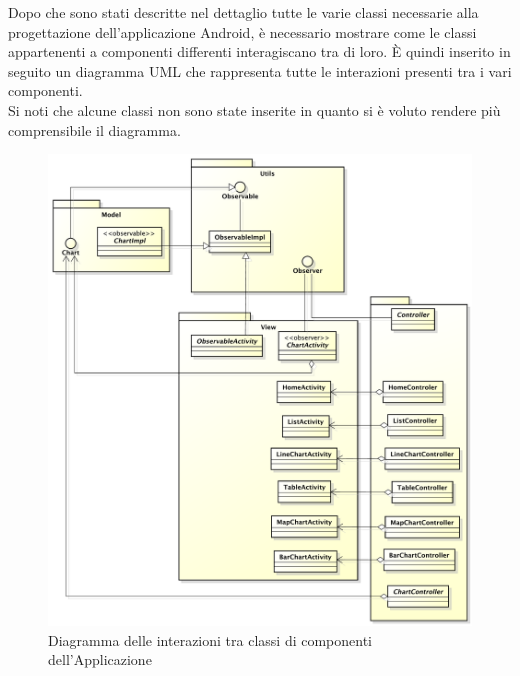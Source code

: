 	Dopo che sono stati descritte nel dettaglio tutte le varie classi necessarie alla progettazione dell'applicazione Android, è necessario mostrare come le classi appartenenti a componenti differenti interagiscano tra di loro. È quindi inserito in seguito un diagramma UML che rappresenta tutte le interazioni presenti tra i vari componenti.\\
	Si noti che alcune classi non sono state inserite in quanto si è voluto rendere più comprensibile il diagramma.

	\begin{figure}[H]\centering
		\includegraphics[width=\textwidth]{SpecificaTecnica/Pics/InterazioniComponentiApplicazione.pdf}
		\caption{Diagramma delle interazioni tra classi di componenti dell'Applicazione}
	\end{figure}